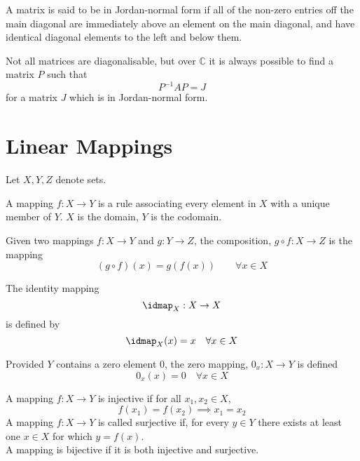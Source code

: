 \begin{definition}
  A matrix is said to be in Jordan-normal form if all of the non-zero
  entries off the main diagonal are immediately above an element on
  the main diagonal, and have identical diagonal elements to the left
  and below them.
\end{definition}

\begin{corollary}
  Not all matrices are diagonalisable, but over $\mathbb{C}$ it is
  always possible to find a matrix $P$ such that \[P^{-1} A P = J \]
  for a matrix $J$ which is in Jordan-normal form.
\end{corollary}

\section{Linear Mappings}
\label{sec:linearmapping}
Let $X,Y,Z$ denote sets.
\begin{definition}[Mapping]
  A mapping $f:X \to Y$ is a rule associating every element in $X$
  with a unique member of $Y$. $X$ is the domain, $Y$ is the codomain.
\end{definition}

\begin{definition}
  Given two mappings $f:X \to Y$ and $g:Y \to Z$, the composition, $g
  \circ f: X \to Z$ is the mapping
  \[ (g \circ f)(x) = g(f(x)) \qquad \forall x \in X \]
\end{definition}

\begin{definition}
  The identity mapping \[ \idmap_X : X \to X \] is defined by \[
  \idmap_X(x) = x \quad \forall x \in X \]
\end{definition}

\begin{definition}
  Provided $Y$ contains a zero element $0$, the zero mapping, $0_x:X
  \to Y$ is defined
  \[ 0_x(x) = 0 \quad \forall x \in X \]
\end{definition}

\begin{definition}
  A mapping $f:X \to Y$ is injective if for all $x_1, x_2 \in X$,
  \[ f(x_1) = f(x_2) \implies x_1 = x_2 \] A mapping $f: X \to Y$ is
  called surjective if, for every $y \in Y$ there exists at least one
  $x \in X$ for which $y = f(x)$.\\
  A mapping is bijective if it is both injective and surjective.
\end{definition}


